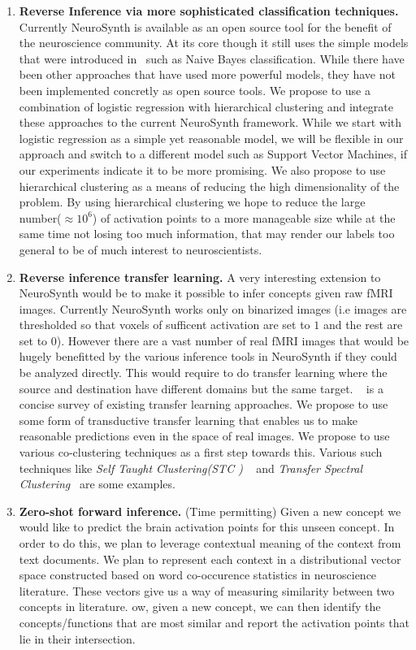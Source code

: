 \documentclass[11pt]{article}
\begin{document}
\begin{enumerate}

    \item {\bf Reverse Inference via more sophisticated classification techniques.} Currently NeuroSynth is available as an open source tool for the benefit of the neuroscience community. At its core though it still uses the simple models that were introduced in~\cite{yarkoni2011large} such as Naive Bayes classification. While there have been other approaches that have used more powerful models, they have not been implemented concretly as open source tools. We propose to use a combination of logistic regression with hierarchical clustering and integrate these approaches to the current NeuroSynth framework. While we start with logistic regression as a simple yet reasonable model, we will be flexible in our approach and switch to a different model such as Support Vector Machines, if our experiments indicate it to be more promising. We also propose to use hierarchical clustering as a means of reducing the high dimensionality of the problem. By using hierarchical clustering we hope to reduce the large number($\approx 10^6$) of activation points to a more manageable size while at the same time not losing too much information, that may render our labels too general to be of much interest to neuroscientists.

    \item {\bf Reverse inference transfer learning.} A very interesting extension to NeuroSynth would be to make it possible to infer concepts given raw fMRI images. Currently NeuroSynth works only on binarized images (i.e images are thresholded so that voxels of sufficent activation are set to $1$ and the rest are set to $0$). However there are a vast number of real fMRI images that would be hugely benefitted by the various inference tools in NeuroSynth if they could be analyzed directly. This would require to do transfer learning where the source and destination have different domains but the same target. ~\cite{pan2010survey,taylor2009transfer} is a concise survey of existing transfer learning approaches. We propose to use some form of transductive transfer learning that enables us to make reasonable predictions even in the space of real images. We propose to use various co-clustering techniques as a first step towards this. Various such techniques like \emph{Self Taught Clustering(STC )} ~\cite{dai2008self} and \emph{Transfer Spectral Clustering}~\cite{jiang2012transfer} are some examples.

    \item {\bf Zero-shot forward inference.}
 (Time permitting)  Given a new concept we would like to predict the brain activation points for this unseen concept. In order to do this, we plan to leverage contextual meaning of the context from text documents. We plan to represent each context in a distributional vector space constructed based on word co-occurence statistics in neuroscience literature. These vectors give us a way of measuring similarity between two concepts in literature. ow, given a new concept, we can then identify the concepts/functions that are most similar and report the activation points that lie in their intersection.


\end{enumerate}
\end{document}
